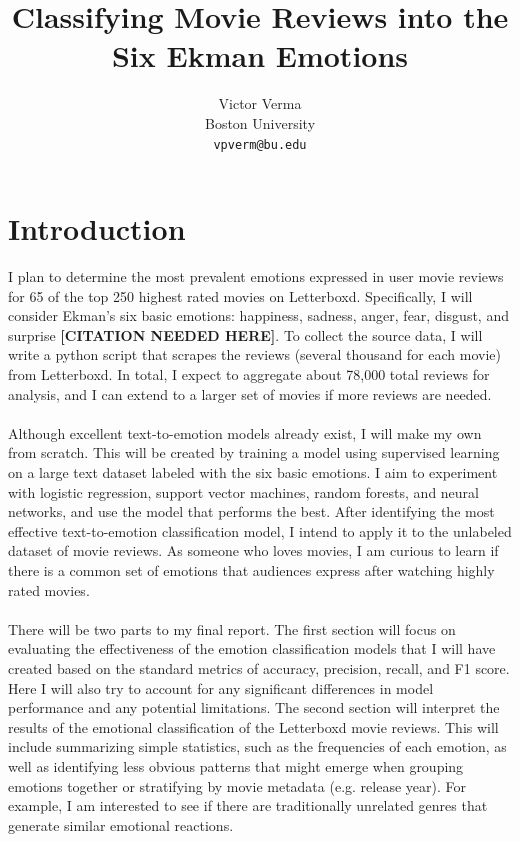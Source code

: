 \documentclass[11pt]{article}
\title{Classifying Movie Reviews into the Six Ekman Emotions}
\author{Victor Verma \\
Boston University \\
\texttt{vpverm@bu.edu}}
\begin{document}
\maketitle
\begin{abstract}
\end{abstract}

\section{Introduction}
I plan to determine the most prevalent emotions expressed in user movie reviews for 65 of the top 250 highest rated movies on Letterboxd. Specifically, I will consider Ekman's six basic emotions: happiness, sadness, anger, fear, disgust, and surprise \textbf{[CITATION NEEDED HERE]}. To collect the source data, I will write a python script that scrapes the reviews (several thousand for each movie) from Letterboxd. In total, I expect to aggregate about 78,000 total reviews for analysis, and I can extend to a larger set of movies if more reviews are needed. \\ \\
Although excellent text-to-emotion models already exist, I will make my own from scratch. This will be created by training a model using supervised learning on a large text dataset labeled with the six basic emotions. I aim to experiment with logistic regression, support vector machines, random forests, and neural networks, and use the model that performs the best. After identifying the most effective text-to-emotion classification model, I intend to apply it to the unlabeled dataset of movie reviews. As someone who loves movies, I am curious to learn if there is a common set of emotions that audiences express after watching highly rated movies. \\ \\
There will be two parts to my final report. The first section will focus on evaluating the effectiveness of the emotion classification models that I will have created based on the standard metrics of accuracy, precision, recall, and F1 score. Here I will also try to account for any significant differences in model performance and any potential limitations. The second section will interpret the results of the emotional classification of the Letterboxd movie reviews. This will include summarizing simple statistics, such as the frequencies of each emotion, as well as identifying less obvious patterns that might emerge when grouping emotions together or stratifying by movie metadata (e.g. release year). For example, I am interested to see if there are traditionally unrelated genres that generate similar emotional reactions. \\ \\
\end{document}

